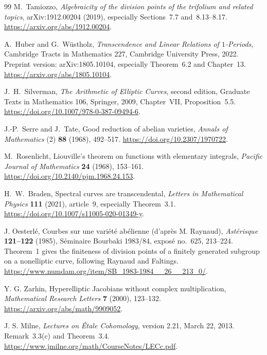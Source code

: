 \documentclass[11pt,a4paper]{article}
\theoremstyle{definition}
\theoremstyle{remark}
\numberwithin{equation}{section}
\begin{document}
\clearpage
\begingroup\small\raggedright
{}
\begin{thebibliography}{99}
M.~Tamiozzo,
\emph{Algebraicity of the division points of the trifolium and related topics},
arXiv:1912.00204 (2019), especially Sections~7.7 and~8.13--8.17.
\url{https://arxiv.org/abs/1912.00204}.

A.~Huber and G.~W\"ustholz,
\emph{Transcendence and Linear Relations of $1$-Periods},
Cambridge Tracts in Mathematics 227, Cambridge University Press, 2022.
Preprint version: arXiv:1805.10104, especially Theorem~6.2 and
Chapter~13.
\url{https://arxiv.org/abs/1805.10104}.

J.~H.~Silverman,
\emph{The Arithmetic of Elliptic Curves}, second edition,
Graduate Texts in Mathematics 106, Springer, 2009,
Chapter~VII, Proposition~5.5.
\url{https://doi.org/10.1007/978-0-387-09494-6}.

J.-P.~Serre and J.~Tate,
Good reduction of abelian varieties,
\emph{Annals of Mathematics} (2) \textbf{88} (1968), 492--517.
\url{https://doi.org/10.2307/1970722}.

M.~Rosenlicht,
Liouville's theorem on functions with elementary integrals,
\emph{Pacific Journal of Mathematics} \textbf{24} (1968), 153--161.
\url{https://doi.org/10.2140/pjm.1968.24.153}.

H.~W.~Braden,
Spectral curves are transcendental,
\emph{Letters in Mathematical Physics} \textbf{111} (2021), article~9,
especially Theorem~3.1.
\url{https://doi.org/10.1007/s11005-020-01349-y}.


J. Oesterl\'e,
Courbes sur une vari\'et\'e ab\'elienne (d'apr\`es M. Raynaud),
\emph{Ast\'erisque} \textbf{121--122} (1985),
S\'eminaire Bourbaki 1983/84, expos\'e no.~625, 213--224.
Theorem~1 gives the finiteness of division points of a finitely generated
subgroup on a nonelliptic curve, following Raynaud and Faltings.
\url{https://www.numdam.org/item/SB_1983-1984__26__213_0/}.

Y. G. Zarhin,
Hyperelliptic Jacobians without complex multiplication,
\emph{Mathematical Research Letters} \textbf{7} (2000), 123--132.
\url{https://arxiv.org/abs/math/9909052}.

J. S. Milne,
\emph{Lectures on \'Etale Cohomology}, version 2.21, March 22, 2013.
Remark~3.3(c) and Theorem~3.4.
\url{https://www.jmilne.org/math/CourseNotes/LECc.pdf}.


\end{thebibliography}
\end{document}
